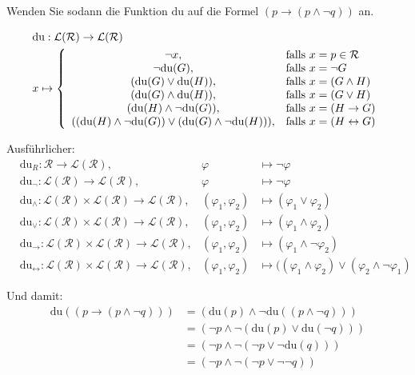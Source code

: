 Wenden Sie sodann die Funktion du auf die Formel $(p\to (p\wedge\neg q))$ an.

\begin{lösung}
	\begin{align*}
		&\text{du}:\mathcal{L}(\mathcal{R})\to\mathcal{L}(\mathcal{R})\\
		&x\mapsto \left\lbrace\begin{array}{cl}
			\neg x, & \text{falls } x=p\in\mathcal{R}\\
			\neg\text{du}(G), & \text{falls } x=\neg G\\
			(\text{du}(G)\vee\text{du}(H)), & \text{falls } x=(G\wedge H)\\
			(\text{du}(G)\wedge\text{du}(H)), & \text{falls } x=(G\vee H)\\
			(\text{du}(H)\wedge\neg\text{du}(G)), & \text{falls } x=(H\to G)\\
			((\text{du}(H)\wedge\neg \text{du}(G))\vee(\text{du}(G)\wedge\neg\text{du}(H))), & \text{falls } x=(H\leftrightarrow G)\\
		\end{array}\right.
	\end{align*}

	Ausführlicher:
	\begin{align*}
		&\text{du}_R:\mathcal{R}\to\mathcal{L}(\mathcal{R}), 
			&\varphi&\mapsto\neg \varphi\\
		&\text{du}_{\neg}:\mathcal{L}(\mathcal{R})\to\mathcal{L}(\mathcal{R}),
			&\varphi&\mapsto\neg\varphi\\
		&\text{du}_{\wedge}:\mathcal{L}(\mathcal{R})\times\mathcal{L}(\mathcal{R})\to\mathcal{L}(\mathcal{R}),
			&(\varphi_1,\varphi_2)&\mapsto(\varphi_1\vee\varphi_2)\\
		&\text{du}_{\vee}:\mathcal{L}(\mathcal{R})\times\mathcal{L}(\mathcal{R})\to\mathcal{L}(\mathcal{R}),
			&(\varphi_1,\varphi_2)&\mapsto(\varphi_1\wedge\varphi_2)\\
		&\text{du}_{\to}:\mathcal{L}(\mathcal{R})\times\mathcal{L}(\mathcal{R})\to\mathcal{L}(\mathcal{R}),
			&(\varphi_1,\varphi_2)&\mapsto(\varphi_1\wedge\neg\varphi_2)\\
		&\text{du}_{\leftrightarrow}:\mathcal{L}(\mathcal{R})\times\mathcal{L}(\mathcal{R})\to\mathcal{L}(\mathcal{R}),
			&(\varphi_1,\varphi_2)&\mapsto((\varphi_1\wedge\varphi_2)\vee(\varphi_2\wedge\neg\varphi_1)
	\end{align*}

	Und damit:
	\begin{align*}
		\text{du}((p\to(p\wedge\neg q)))
		&=(\text{du}(p)\wedge\neg\text{du}((p\wedge\neg q)))\\
		&=(\neg p\wedge\neg(\text{du}(p)\vee\text{du}(\neg q)))\\
		&=(\neg p\wedge\neg(\neg p\vee\neg\text{du}(q)))\\
		&=(\neg p\wedge\neg(\neg p\vee\neg\neg q))\\
	\end{align*}
\end{lösung}
